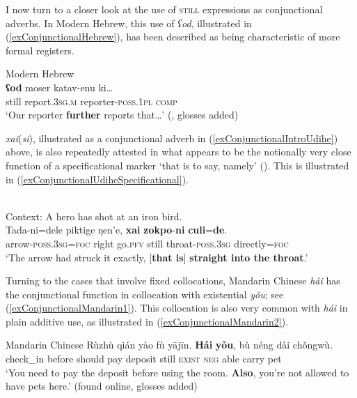 { I now turn to a closer look at the use of \textsc{still} expressions as conjunctional adverbs.
In Modern Hebrew, this use of \textit{ʕod}, illustrated in (\ref{exConjunctionalHebrew}), has been described as being characteristic of more formal registers.

\begin{exe}
	\ex Modern Hebrew\label{exConjunctionalHebrew}\\
		\gll \textbf{ʕod} moser katav-enu ki…\\
	still report.3\textsc{sg}.\textsc{m} reporter-\textsc{poss}.1\textsc{pl} \textsc{comp}\\
	\glt \lq Our reporter \textbf{further} reports that…' (\cite[537]{Glinert1989}, glosses added)
\end{exe}

 \mbox{\textit{xai}(\textit{si})}, illustrated as a conjunctional adverb in (\ref{exConjunctionalIntroUdihe}) above, is also repeatedly attested in what appears to be the notionally very close function of a specificational marker \lq that is to say, namely\rq{ }(). This is illustrated in (\ref{exConjunctionalUdiheSpecificational}).

\begin{exe}
	\ex {}\label{exConjunctionalUdiheSpecificational}\\
	Context: A hero has shot at an iron bird.\\
	\gll Tada-ni=dele piktige ŋen’e, \textbf{xai} \textbf{zokpo}-\textbf{ni} \textbf{culi}=\textbf{de}.\\
	arrow-\textsc{poss}.3\textsc{sg}=\textsc{foc} right go.\textsc{pfv} still throat-\textsc{poss}.3\textsc{sg} directly=\textsc{foc}\\
	\glt \lq The arrow had struck it exactly, [\textbf{that is}] \textbf{straight into the throat}.' \parencite[Sisam Zauli and the hero]{NikolaevaEtAl2019}
\end{exe}

Turning to the cases that involve fixed collocations, Mandarin Chinese \textit{hái} has the conjunctional function in collocation with existential \textit{yǒu}; see (\ref{exConjunctionalMandarin1}). This collocation is also very common with \textit{hái} in plain additive use, as illustrated in (\ref{exConjunctionalMandarin2}).

\begin{exe}
	\ex
	\begin{xlist}
		\exi{}Mandarin Chinese
		\ex\label{exConjunctionalMandarin1}
	\gll Rùzhù qián yào fù yājīn. \textbf{Hái} \textbf{yǒu}, bù néng dài chǒngwù.\\
	check\_in before should pay deposit still \textsc{exist} \textsc{neg} able carry pet\\
	\glt \lq You need to pay the deposit before using the room. \textbf{Also}, you're not allowed to have pets here.' (found online, glosses added)%
	

\end{xlist}
\end{exe}}
